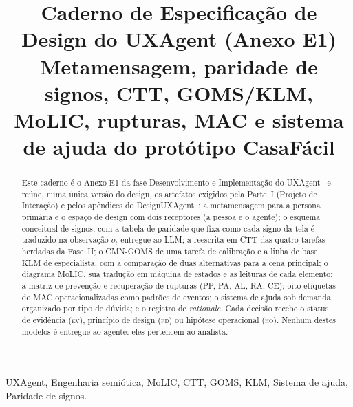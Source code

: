 \documentclass[conference,onecolumn]{IEEEtran}
\newcommand{\stEV}{\textsc{ev}}
\newcommand{\stPD}{\textsc{pd}}
\newcommand{\stHO}{\textsc{ho}}
\begin{document}
\title{Caderno de Especificação de Design do UXAgent (Anexo E1)\\[4pt]\large Metamensagem, paridade de signos, CTT, GOMS/KLM, MoLIC, rupturas, MAC e sistema de ajuda do protótipo CasaFácil}

\author{
\and
{}
}

\maketitle

\begin{abstract}
Este caderno é o Anexo E1 da fase Desenvolvimento e Implementação do UXAgent~\cite{lara2026p3} e reúne, numa única versão do design, os artefatos exigidos pela Parte~I (Projeto de Interação) e pelos apêndices do DesignUXAgent~\cite{lara2026a3}: a metamensagem para a persona primária e o espaço de design com dois receptores (a pessoa e o agente); o esquema conceitual de signos, com a tabela de paridade que fixa como cada signo da tela é traduzido na observação $o_t$ entregue ao LLM; a reescrita em CTT das quatro tarefas herdadas da Fase~II; o CMN-GOMS de uma tarefa de calibração e a linha de base KLM de especialista, com a comparação de duas alternativas para a cena principal; o diagrama MoLIC, sua tradução em máquina de estados e as leituras de cada elemento; a matriz de prevenção e recuperação de rupturas (PP, PA, AL, RA, CE); oito etiquetas do MAC operacionalizadas como padrões de eventos; o sistema de ajuda sob demanda, organizado por tipo de dúvida; e o registro de \textit{rationale}. Cada decisão recebe o status de evidência (\stEV), princípio de design (\stPD) ou hipótese operacional (\stHO). Nenhum destes modelos é entregue ao agente: eles pertencem ao analista.
\end{abstract}

\begin{IEEEkeywords}
UXAgent, Engenharia semiótica, MoLIC, CTT, GOMS, KLM, Sistema de ajuda, Paridade de signos.
\end{IEEEkeywords}
\end{document}
